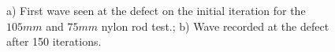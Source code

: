   \begin{figure}
 \begin{subfigmatrix}{2}
 \end{subfigmatrix}
 
    \caption
    { \label{fig:nylonExp3}
    a) First wave seen at the defect on the initial iteration for the $105 mm$ and $75 mm$ nylon rod test.; b) Wave recorded at the defect after 150 iterations.
  }
 \end{figure}
 